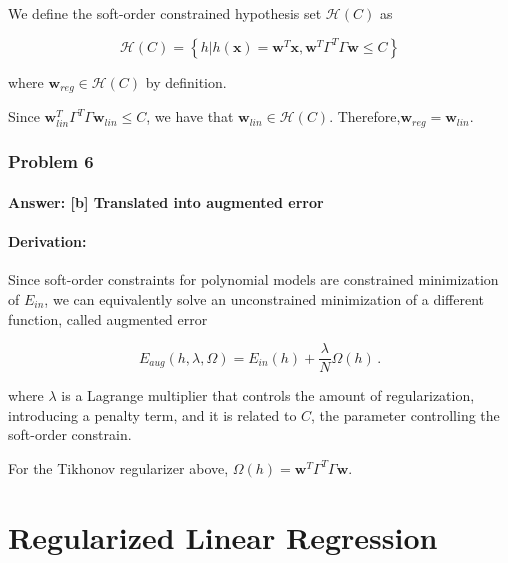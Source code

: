 \documentclass[11pt]{article}
\begin{document}
We define the soft-order constrained hypothesis set \(\mathcal{H}(C)\)
as

\begin{equation}
\mathcal{H}(C)=\left\{h|h(\mathbf{x})=\mathbf{w}^T\mathbf{x}, \mathbf{w}^T\Gamma^T\Gamma\mathbf{w}\le C\right\}
\end{equation}

where \(\mathbf{w}_{reg}\in \mathcal{H}(C)\) by definition.

Since \(\mathbf{w}_{lin}^T\Gamma^T\Gamma\mathbf{w}_{lin}\le C\), we have
that \(\mathbf{w}_{lin}\in\mathcal{H}(C)\).
Therefore,\(\mathbf{w}_{reg}=\mathbf{w}_{lin}\).

    \hypertarget{problem-6}{%
\section{Problem 6}\label{problem-6}}

\hypertarget{answer-b-translated-into-augmented-error}{%
\subsection{Answer: {[}b{]} Translated into augmented
error}\label{answer-b-translated-into-augmented-error}}

\hypertarget{derivation}{%
\subsection{Derivation:}\label{derivation}}

Since soft-order constraints for polynomial models are constrained
minimization of \(E_{in}\), we can equivalently solve an unconstrained
minimization of a different function, called augmented error

\begin{equation}
E_{aug}(h,\lambda,\Omega) = E_{in}(h)+\frac{\lambda}{N}\Omega(h)\,.
\end{equation}

where \(\lambda\) is a Lagrange multiplier that controls the amount of
regularization, introducing a penalty term, and it is related to \(C\),
the parameter controlling the soft-order constrain.

For the Tikhonov regularizer above,
\(\Omega(h)=\mathbf{w}^T\Gamma^T\Gamma\mathbf{w}\).

    \hypertarget{regularized-linear-regression}{%
\part{Regularized Linear
Regression}\label{regularized-linear-regression}}
\end{document}
